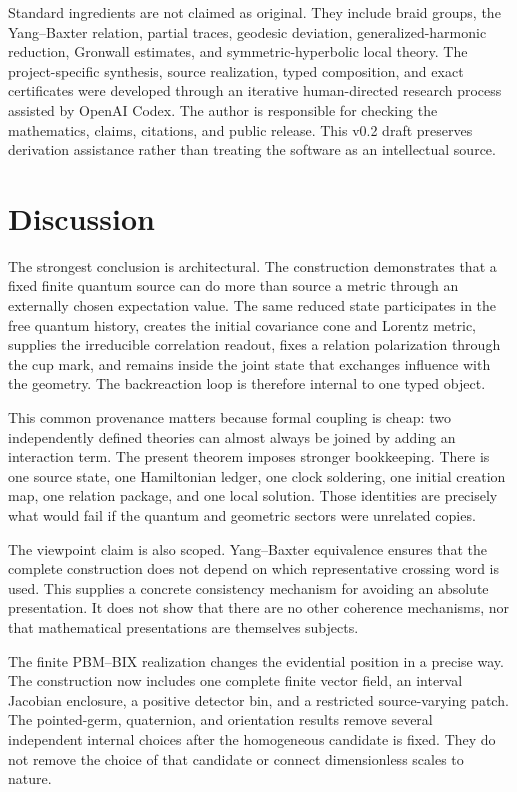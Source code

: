 \documentclass[11pt]{article}
\theoremstyle{definition}
\theoremstyle{remark}
\begin{document}
Standard ingredients are not claimed as original. They include braid groups, the Yang--Baxter relation, partial traces, geodesic deviation, generalized-harmonic reduction, Gronwall estimates, and symmetric-hyperbolic local theory. The project-specific synthesis, source realization, typed composition, and exact certificates were developed through an iterative human-directed research process assisted by OpenAI Codex. The author is responsible for checking the mathematics, claims, citations, and public release. This v0.2 draft preserves derivation assistance rather than treating the software as an intellectual source.

\section{Discussion}

The strongest conclusion is architectural. The construction demonstrates that a fixed finite quantum source can do more than source a metric through an externally chosen expectation value. The same reduced state participates in the free quantum history, creates the initial covariance cone and Lorentz metric, supplies the irreducible correlation readout, fixes a relation polarization through the cup mark, and remains inside the joint state that exchanges influence with the geometry. The backreaction loop is therefore internal to one typed object.

This common provenance matters because formal coupling is cheap: two independently defined theories can almost always be joined by adding an interaction term. The present theorem imposes stronger bookkeeping. There is one source state, one Hamiltonian ledger, one clock soldering, one initial creation map, one relation package, and one local solution. Those identities are precisely what would fail if the quantum and geometric sectors were unrelated copies.

The viewpoint claim is also scoped. Yang--Baxter equivalence ensures that the complete construction does not depend on which representative crossing word is used. This supplies a concrete consistency mechanism for avoiding an absolute presentation. It does not show that there are no other coherence mechanisms, nor that mathematical presentations are themselves subjects.

The finite PBM--BIX realization changes the evidential position in a precise way. The construction now includes one complete finite vector field, an interval Jacobian enclosure, a positive detector bin, and a restricted source-varying patch. The pointed-germ, quaternion, and orientation results remove several independent internal choices after the homogeneous candidate is fixed. They do not remove the choice of that candidate or connect dimensionless scales to nature.
\end{document}
